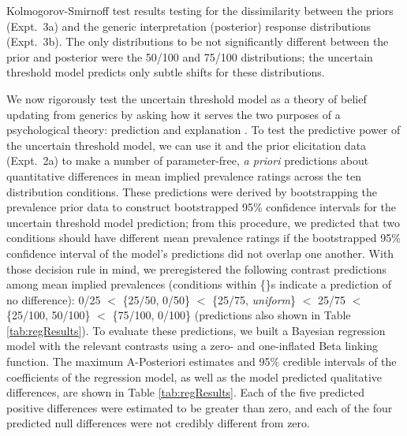 \documentclass[floatsintext,doc]{apa6}
\begin{document}
\begin{center}
  \begin{table}[h]
    \centering

    \caption{Kolmogorov-Smirnoff test results testing for the dissimilarity between the priors (Expt.~3a) and the generic interpretation (posterior) response distributions (Expt.~3b). The only distributions to be not significantly different between the prior and posterior were the 50/100 and 75/100 distributions; the uncertain threshold model predicts only subtle shifts for these distributions.}
    \label{tab:ks}
  \end{table}
\end{center}


We now rigorously test the uncertain threshold model as a theory of belief updating from generics by asking how it serves the two purposes of a psychological theory: prediction and explanation \cite{shmueli2010explain, yarkoni2017choosing}. 
To test the predictive power of the uncertain threshold model, we can use it and the prior elicitation data (Expt.~2a) to make a number of parameter-free, \emph{a priori} predictions about quantitative differences in mean implied prevalence ratings across the ten distribution conditions.
These predictions were derived by bootstrapping the prevalence prior data to construct bootstrapped 95\% confidence intervals for the uncertain threshold model prediction; from this procedure, we predicted that two conditions should have different mean prevalence ratings if the bootstrapped 95\% confidence interval of the model's predictions did not overlap one another.
With those decision rule in mind, we preregistered the following contrast predictions among mean implied prevalences (conditions within \{\}s indicate a prediction of no difference): 0/25 \(<\) \{25/50, 0/50\} \(<\) \{25/75, \emph{uniform}\} \(<\) 25/75 \(<\) \{25/100, 50/100\} \(<\) \{75/100, 0/100\} (predictions also shown in Table \ref{tab:regResults}).
To evaluate these predictions, we built a Bayesian regression model with the relevant contrasts using a zero- and one-inflated Beta linking function.
The maximum A-Posteriori estimates and 95\% credible intervals of the coefficients of the regression model, as well as the model predicted qualitative differences, are shown in Table \ref{tab:regResults}.
Each of the five predicted positive differences were estimated to be greater than zero, and each of the four predicted null differences were not credibly different from zero.
\end{document}
